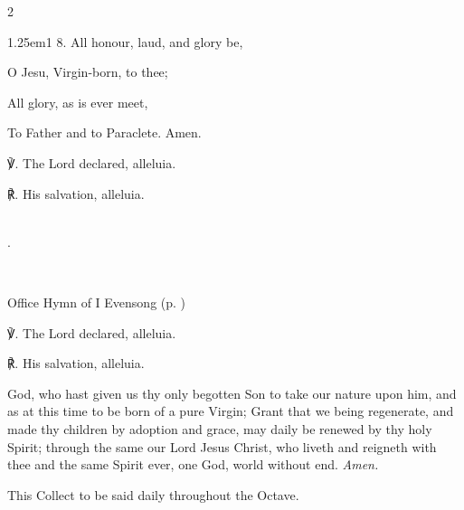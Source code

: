 \begin{multicols}{2}
\begin{hangparas}{1.25em}{1}
8. All honour, laud, and glory be,

O Jesu, Virgin-born, to thee;

All glory, as is ever meet,

To Father and to Paraclete. Amen.\\
\end{hangparas}

℣. The Lord declared, alleluia.

℟. His salvation, alleluia.

\\

{\color{white}.}

\fussy	
\end{multicols}


\secondEvensong

\\

\begin{rubric}
	Office Hymn of I Evensong (p. \pageref{ChristmasEvensongHymn})
\end{rubric}

℣. The Lord declared, alleluia.

℟. His salvation, alleluia.



\collect\label{ChristmasCollect}
 God, who hast given us thy only begotten Son to take our nature upon him, and as at this time to be born of a pure Virgin; Grant that we being regenerate, and made thy children by adoption and grace, may daily be renewed by thy holy Spirit; through the same our Lord Jesus Christ, who liveth and reigneth with thee and the same Spirit ever, one God, world without end. \textit{Amen.}

\begin{rubric}
	This Collect to be said daily throughout the Octave.
\end{rubric}


\clearpage
{}\label{SaintStephen}

